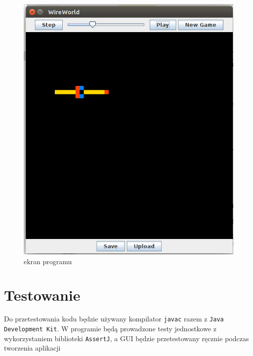 \documentclass[a4paper, 12pt]{article}
\begin{document}
			\begin{figure}
			\includegraphics[width=\textwidth]{gui.png}
			\caption{ekran programu}
			\end{figure}	
		
	\section{Testowanie}
		\hspace{1cm} Do przetestowania kodu będzie używany kompilator \texttt{javac} razem z \texttt{Java Development Kit}. W programie będą prowadzone testy jednostkowe z wykorzystaniem biblioteki \texttt{AssertJ}, a GUI będzie przetestowany ręcznie podczas tworzenia aplikacji
\label{LastPage}~
\label{LastPageOfBackMatter}~		
\end{document}
